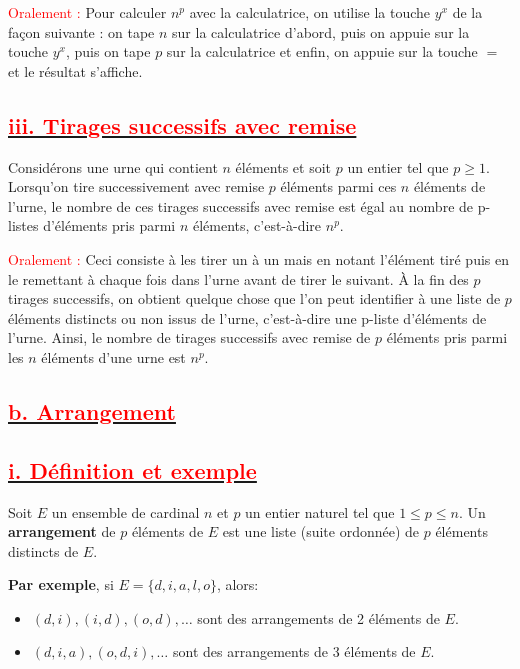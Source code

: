 \documentclass[12pt]{article}
\begin{document}
\textcolor{red}{Oralement :} Pour calculer \(n^{p}\) avec la calculatrice, on utilise la touche \(y^{x}\) de la façon suivante : on tape \(n\) sur la calculatrice d'abord, puis on appuie sur la touche \(y^{x}\), puis on tape \(p\) sur la calculatrice et enfin, on appuie sur la touche \(=\) et le résultat s’affiche.
\subsection*{\underline{\textbf{\textcolor{red}{iii. Tirages successifs avec remise}}}}
Considérons une urne qui contient \(n\) éléments et soit \(p\) un entier tel que \(p \geq 1\). Lorsqu'on tire successivement avec remise \(p\) éléments parmi ces \(n\) éléments de l’urne, le nombre de ces tirages successifs avec remise est égal au nombre de p-listes d’éléments pris parmi \(n\) éléments, c’est-à-dire \(n^{p}\).

\textcolor{red}{Oralement :} Ceci consiste à les tirer un à un mais en notant l’élément tiré puis en le remettant à chaque fois dans l’urne avant de tirer le suivant. À la fin des \(p\) tirages successifs, on obtient quelque chose que l’on peut identifier à une liste de \(p\) éléments distincts ou non issus de l’urne, c’est-à-dire une p-liste d’éléments de l’urne. Ainsi, le nombre de tirages successifs avec remise de \(p\) éléments pris parmi les \(n\) éléments d’une urne est \(n^{p}\).
\subsection*{\underline{\textbf{\textcolor{red}{b. Arrangement}}}}
\subsection*{\underline{\textbf{\textcolor{red}{i. Définition et exemple}}}}
Soit \( E \) un ensemble de cardinal \( n \) et \( p \) un entier naturel tel que \( 1 \leq p \leq n \). Un \textbf{arrangement} de \( p \) éléments de \( E \) est une liste (suite ordonnée) de \( p \) éléments distincts de \( E \).

\textbf{Par exemple}, si \( E = \{d, i, a, l, o\} \), alors:
\begin{itemize}
    \item \( (d, i), (i, d), (o, d), \ldots \) sont des arrangements de 2 éléments de \( E \).
    \item \( (d, i, a), (o, d, i), \ldots \) sont des arrangements de 3 éléments de \( E \).
\end{itemize}
\end{document}
